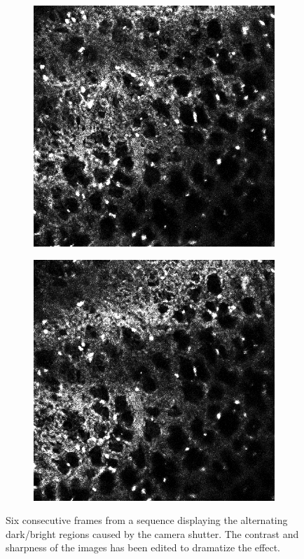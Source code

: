 \begin{figure}[h]
\begin{subfigure}{.32\textwidth}
		\end{subfigure}%
		\hfill
		\begin{subfigure}{.32\textwidth}
		\includegraphics[width=\textwidth]{images/shutterseriesm170_13cropped005}
		\end{subfigure}%
		\hfill
		\begin{subfigure}{.32\textwidth}
		\includegraphics[width=\textwidth]{images/shutterseriesm170_13cropped006}
		\end{subfigure}
		\caption{Six consecutive frames from a sequence displaying the alternating dark/bright regions caused by the camera shutter. The contrast and sharpness of the images has been edited to dramatize the effect.}
		\label{fig:data_challenge_shutter}
	\end{figure}
	
